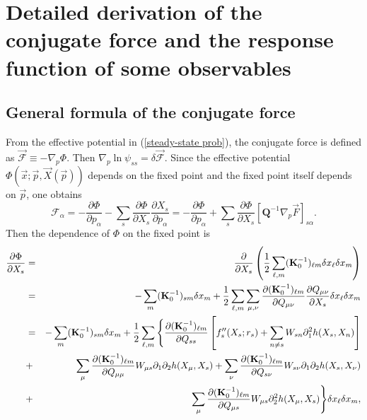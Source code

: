 \section{Detailed derivation of the conjugate force and the response function of some observables}
\subsection{General formula of the conjugate force}
\quad From the effective potential in (\ref{steady-state prob}), the conjugate force is defined as $\vec{\mathscr{F}} \equiv -\nabla_p \Phi$. Then $\nabla_p \ln{\psi_{ss}} = \delta \vec{\mathscr{F}}$. Since the effective potential $\Phi(\vec{x}; \vec{p}, \vec{X}(\vec{p}))$ depends on the fixed point and the fixed point itself depends on $\vec{p}$, one obtains
\begin{equation}
    \mathscr{F}_\alpha = -\frac{\partial \Phi}{\partial p_\alpha} - \sum_s \frac{\partial \Phi}{\partial X_s} \frac{\partial X_s}{\partial p_\alpha} = -\frac{\partial \Phi}{\partial p_\alpha} + \sum_s \frac{\partial \Phi}{\partial X_s} \left[ \mathbf{Q}^{-1} \nabla_p \vec{F} \right]_{s\alpha}.
    \label{scriptF}
\end{equation} 
Then the dependence of $\Phi$ on the fixed point is
\begin{eqnarray}
    \frac{\partial \Phi}{\partial X_s} &=& \frac{\partial }{\partial X_s} \left( \frac{1}{2} \sum_{\ell,m} ({\bf K}_0^{-1})_{\ell m} \delta x_\ell \delta x_m \right)\\
    &=&-\sum_{m}({\bf K}_0^{-1})_{sm}\delta x_m + \frac{1}{2}\sum_{\ell,m} \sum_{\mu,\nu} \frac{\partial ({\bf K}_0^{-1})_{\ell m}}{\partial Q_{\mu\nu}}\frac{\partial Q_{\mu\nu}}{\partial X_s} \delta x_\ell \delta x_m\nonumber\\
    &=& -\sum_{m}({\bf K}_0^{-1})_{sm}\delta x_m +\frac{1}{2}\sum_{\ell,m} \Bigg\{\frac{\partial ({\bf K}_0^{-1})_{\ell m}}{\partial Q_{ss}} \left[f''_s(X_s;r_s)+\sum_{n\neq s} W_{s n}\partial^2_{1}h(X_s,X_n)\right]\nonumber\\ &+&\sum_{\mu}\frac{\partial ({\bf K}_0^{-1})_{\ell m}}{\partial Q_{\mu\mu}} W_{\mu s} \partial_{1}\partial_2 h(X_\mu,X_s) + \sum_{\nu}\frac{\partial ({\bf K}_0^{-1})_{\ell m}}{\partial Q_{s\nu}} W_{s \nu}  \partial_{1}\partial_2 h(X_s,X_\nu)\nonumber\\
    &+&\sum_{\mu} \frac{\partial ({\bf K}_0^{-1})_{\ell m}}{\partial Q_{\mu s} }W_{\mu s} \partial^2_{2}h(X_\mu,X_s) \Bigg\} \delta x_\ell \delta x_m\nonumber,
    \label{pphipX}
\end{eqnarray}

